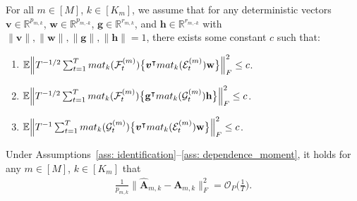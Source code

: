 \documentclass[10pt,a4paper]{amsart}
\def\E{\mathbb{E}}
\def\R{\mathbb{R}}
\def\bA{\mathbf{A}}
\def\bg{\mathbf{g}}
\def\bh{\mathbf{h}}
\def\bv{\boldsymbol{v}}
\def\bw{\mathbf{w}}
\def\cE{\mathcal{E}}
\def\cF{\mathcal{F}}
\def\cG{\mathcal{G}} \def\cH{\boldsymbol{\mathcal{H}}} \def\cI{\mathcal{I}}
\def\cO{\mathcal{O}}
\def\mat{\textnormal{\textsc{mat}}}
\def\trans{\intercal}
\def\wh#1{\widehat{#1}}
\begin{document}
\begin{assumption}\label{ass: dependence_thread}
For all $m\in[M]$, $k\in[K_m]$, we assume that for any deterministic vectors $\bv\in\R^{p_{m,k}}$, $\bw\in\R^{p_{m,\text{-}k}}$, $\bg\in\R^{r_{m,k}}$, and $\bh\in\R^{r_{m,\text{-}k}}$ with $\|\bv\|, \|\bw\|, \|\bg\|, \|\bh\| =1$, there exists some constant $c$ such that: 
\begin{enumerate}[itemsep=0pt, label = (\alph*), left = 0pt]
    \item $\E\Big\| T^{-1/2} \sum_{t=1}^T \mat_k(\cF_t^{(m)}) \big\{ \bv^\trans \mat_k(\cE_t^{(m)}) \bw \big\} \Big\|_F^2 \leq c$.
    \item $\E\Big\| T^{-1/2} \sum_{t=1}^T \mat_k(\cF_t^{(m)}) \big\{ \bg^\trans \mat_k(\cG_t^{(m)}) \bh \big\} \Big\|_F^2 \leq c$.
    \item $\E\Big\| T^{-1} \sum_{t=1}^T \mat_k(\cG_t^{(m)}) \big\{ \bv^\trans \mat_k(\cE_t^{(m)}) \bw \big\} \Big\|_F^2 \leq c$.
\end{enumerate}

\end{assumption}

\begin{theorem}\label{thm: global_loading}
Under Assumptions~\ref{ass: identification}--\ref{ass: dependence_moment}, it holds for any $m\in[M]$, $k\in[K_m]$ that
\begin{align*}
    \frac{1}{p_{m,k}} \Big\| \wh{\bA}_{m,k} -\bA_{m,k} \Big\|_F^2 = \cO_P\Big( \frac{1}{T} \Big) .
\end{align*}
\end{theorem}
\end{document}
